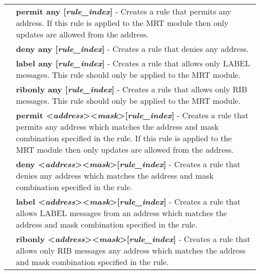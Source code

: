 \begin{tabular}{|p{10pt}p{400pt}|}
& {\bf \small permit any [\emph{rule\_index}]} - Creates a rule that permits any address.  If this rule is applied to the MRT module then only updates are allowed from the address. \\[4pt]

& {\bf \small deny any [\emph{rule\_index}]} - Creates a rule that denies any address. \\[4pt]

& {\bf \small label any [\emph{rule\_index}]} - Creates a rule that allows only LABEL messages.  This rule should only be applied to the MRT module. \\[4pt]

& {\bf \small ribonly any [\emph{rule\_index}]} - Creates a rule that allows only RIB messages.  This rule should only be applied to the MRT module. \\[4pt]

& {\bf \small permit \textless\emph{address}\textgreater \textless\emph{mask}\textgreater [\emph{rule\_index}]} - Creates a rule that permits any address which matches the address and mask combination specified in the rule.  If this rule is applied to the MRT module then only updates are allowed from the address.\\[4pt]

& {\bf \small deny \textless\emph{address}\textgreater \textless\emph{mask}\textgreater [\emph{rule\_index}]} - Creates a rule that denies any address which matches the address and mask combination specified in the rule.\\[4pt]

& {\bf \small label \textless\emph{address}\textgreater \textless\emph{mask}\textgreater [\emph{rule\_index}]} - Creates a rule that allows LABEL messages from an address which matches the address and mask combination specified in the rule.\\[4pt]

& {\bf \small ribonly \textless\emph{address}\textgreater \textless\emph{mask}\textgreater [\emph{rule\_index}]} - Creates a rule that allows only RIB messages any address which matches the address and mask combination specified in the rule.\\[4pt]

\hline

\end{tabular}

